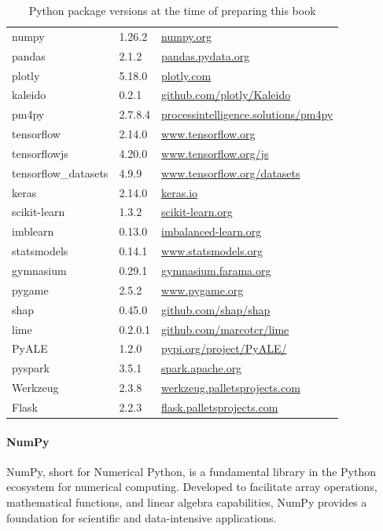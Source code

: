 \begin{withcode}
\begin{table}
\renewcommand{\arraystretch}{1.25}
\begin{tabular}{l|l|l} \hline
numpy & 1.26.2 & \url{numpy.org} \\
pandas & 2.1.2 & \url{pandas.pydata.org} \\
plotly & 5.18.0 & \url{plotly.com} \\ 
kaleido & 0.2.1 & \url{github.com/plotly/Kaleido} \\
pm4py & 2.7.8.4 & \url{processintelligence.solutions/pm4py} \\
tensorflow & 2.14.0 & \url{www.tensorflow.org} \\
tensorflowjs & 4.20.0 & \url{www.tensorflow.org/js} \\
tensorflow\_datasets & 4.9.9 & \url{www.tensorflow.org/datasets} \\
keras & 2.14.0 & \url{keras.io} \\
scikit-learn & 1.3.2 & \url{scikit-learn.org} \\
imblearn & 0.13.0 & \url{imbalanced-learn.org} \\
statsmodels & 0.14.1 & \url{www.statsmodels.org} \\
gymnasium & 0.29.1 & \url{gymnasium.farama.org} \\
pygame & 2.5.2 & \url{www.pygame.org} \\
shap & 0.45.0 & \url{github.com/shap/shap} \\
lime & 0.2.0.1 & \url{github.com/marcotcr/lime} \\
PyALE & 1.2.0 & \url{pypi.org/project/PyALE/} \\
pyspark & 3.5.1 & \url{spark.apache.org} \\
Werkzeug & 2.3.8 & \url{werkzeug.palletsprojects.com} \\
Flask & 2.2.3 & \url{flask.palletsprojects.com} \\ \hline
\end{tabular}
\caption[Python packages used in this book]{Python package versions at the time of preparing this book}
\label{tab:Pythonsoftware}
\end{table}

\paragraph*{NumPy} NumPy, short for Numerical Python, is a fundamental library in the Python ecosystem for numerical computing. Developed to facilitate array operations, mathematical functions, and linear algebra capabilities, NumPy provides a foundation for scientific and data-intensive applications.


\end{withcode}

